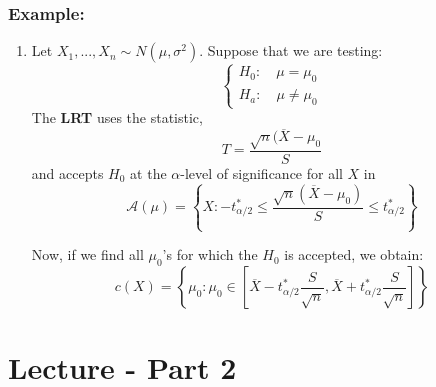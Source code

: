 \documentclass{article}
\begin{document}
\subsubsection*{Example:}
\begin{enumerate}
        \item Let $X_1,...,X_n \sim N(\mu,\sigma^2)$. Suppose that we are testing:
    \begin{equation*}
        \begin{cases}
            H_0: \quad \mu = \mu_0\\
            H_a: \quad \mu \neq \mu_0
        \end{cases}
    \end{equation*}
    The \textbf{LRT} uses the statistic,
    \begin{equation*}
        T = \frac{\sqrt{n}(\overline{X}-\mu_0}{S}
    \end{equation*}
    and accepts $H_0$ at the $\alpha$-level of significance for all $X$ in
    \begin{equation*}
        \mathcal{A}(\mu) = \left\{ X: -t^*_{\alpha/2} \leq \frac{\sqrt{n}(\overline{X}-\mu_0)}{S} \leq t_{\alpha/2}^*\right\}
    \end{equation*}
    
    Now, if we find all $\mu_0$'s for which the $H_0$ is accepted, we obtain:
    \begin{equation*}
        c(X) = \left\{ \mu_0: \mu_0 \in \left[\overline{X} - t^*_{\alpha/2} \frac{S}{\sqrt{n}}, \overline{X} + t^*_{\alpha/2} \frac{S}{\sqrt{n}} \right] \right\}
    \end{equation*}
\end{enumerate}
\section{Lecture - Part 2}
\end{document}
